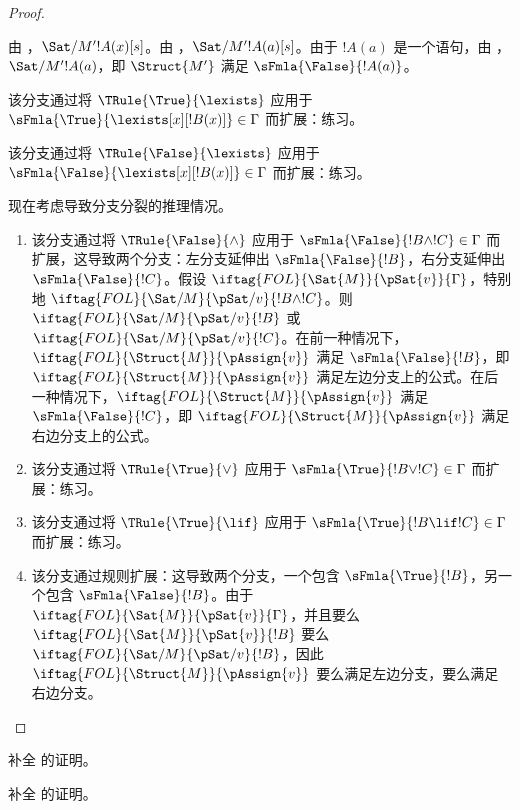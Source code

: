 \documentclass[../../../include/open-logic-section]{subfiles}
\begin{document}
\begin{proof}
\begin{enumerate}
{由 ，$\Sat/{M'}{!A(x)}[s]$。由 ，$\Sat/{M'}{!A(a)}[s]$。由于 $!A(a)$ 是一个语句，由 ，$\Sat/{M'}{!A(a)}$，即 $\Struct{M'}$ 满足 $\sFmla{\False}{!A(a)}$。
\item 该分支通过将 $\TRule{\True}{\lexists}$ 应用于 $\sFmla{\True}{\lexists[x][!B(x)]} \in \Gamma$ 而扩展：练习。
\item 该分支通过将 $\TRule{\False}{\lexists}$ 应用于 $\sFmla{\False}{\lexists[x][!B(x)]} \in \Gamma$ 而扩展：练习。}{}
\end{enumerate}
现在考虑导致分支分裂的推理情况。
\begin{enumerate}
\item 该分支通过将 $\TRule{\False}{\land}$ 应用于 $\sFmla{\False}{!B \land !C} \in \Gamma$ 而扩展，这导致两个分支：左分支延伸出 $\sFmla{\False}{!B}$，右分支延伸出 $\sFmla{\False}{!C}$。假设 $\iftag{FOL}{\Sat{M}}{\pSat{v}}{\Gamma}$，特别地 $\iftag{FOL}{\Sat/{M}}{\pSat/{v}}{!B \land !C}$。则 $\iftag{FOL}{\Sat/{M}}{\pSat/{v}}{!B}$ 或 $\iftag{FOL}{\Sat/{M}}{\pSat/{v}}{!C}$。在前一种情况下，$\iftag{FOL}{\Struct{M}}{\pAssign{v}}$ 满足 $\sFmla{\False}{!B}$，即 $\iftag{FOL}{\Struct{M}}{\pAssign{v}}$ 满足左边分支上的公式。在后一种情况下，$\iftag{FOL}{\Struct{M}}{\pAssign{v}}$ 满足 $\sFmla{\False}{!C}$，即 $\iftag{FOL}{\Struct{M}}{\pAssign{v}}$ 满足右边分支上的公式。
\item 该分支通过将 $\TRule{\True}{\lor}$ 应用于 $\sFmla{\True}{!B \lor !C} \in \Gamma$ 而扩展：练习。
\item 该分支通过将 $\TRule{\True}{\lif}$ 应用于 $\sFmla{\True}{!B \lif !C} \in \Gamma$ 而扩展：练习。
\item 该分支通过\Cut 规则扩展：这导致两个分支，一个包含 $\sFmla{\True}{!B}$，另一个包含 $\sFmla{\False}{!B}$。由于 $\iftag{FOL}{\Sat{M}}{\pSat{v}}{\Gamma}$，并且要么 $\iftag{FOL}{\Sat{M}}{\pSat{v}}{!B}$ 要么 $\iftag{FOL}{\Sat/{M}}{\pSat/{v}}{!B}$，因此 $\iftag{FOL}{\Struct{M}}{\pAssign{v}}$ 要么满足左边分支，要么满足右边分支。
\end{enumerate}
\end{proof}

\begin{prob}
补全  的证明。
\end{prob}
\tagendprob

\begin{prob}
补全  的证明。
\end{prob}
\tagendprob
\end{document}
